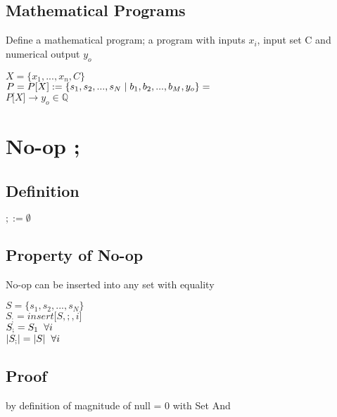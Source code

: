 \documentclass[11pt]{article}
\begin{document}
\subsection{Mathematical Programs}
Define a mathematical program; a program with inputs $x_i$, input set C and numerical output $y_o$
\begin{center}
$
X = \{x_1,...,x_n,C\}
$
\\ \vspace{2mm}
$P = P\lbrack X \rbrack := \{ s_1,s_2,...,s_{N}\hspace{1mm}|\hspace{1mm} b_1, b_2,...,b_M,y_o\}=$
\\ \vspace{2mm}
$
P\lbrack X \rbrack \rightarrow y_o \in \mathbb{Q}
$
\end{center}




\newpage
\section{No-op ;}

\subsection{Definition}
\begin{center}
$
; := \emptyset
$
\end{center}

\subsection{Property of No-op}
No-op can be inserted into any set with equality
\begin{center}
$
S= \{s_1,s_2,...,s_N\}
$
\\ \vspace{2mm}
$
S_; = insert \lbrack S,;, i \rbrack
$
\\ \vspace{2mm}
$
S_; = S_1 \hspace{2mm} \forall i
$
\\ \vspace{2mm}
$
|S_;| = |S| \hspace{2mm} \forall i
$
\end{center}


\subsection{Proof}
by definition of magnitude of null = 0 with Set And
\end{document}
